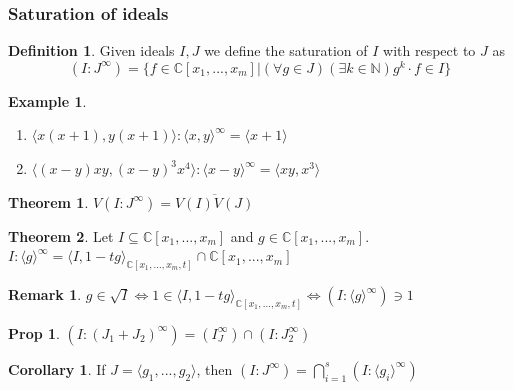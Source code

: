 \documentclass{article}
\theoremstyle{definition}
\newtheorem*{obs}{Remark}
\newtheorem{thm}{Theorem}
\newtheorem{cor}{Corollary}
\newtheorem*{prop}{Prop}
\newtheorem*{defn}{Definition}
\newtheorem{ex}{Example}
\newcommand{\N}{\mathbb{N}}
\newcommand{\C}{\mathbb{C}}
\begin{document}
\subsubsection{Saturation of ideals}
\begin{defn}
	Given ideals $I,J$ we define the saturation of $I$ with respect to $J$ as 
	$$
	(I:J^\infty)=\{f\in\C[x_1,...,x_m]|(\forall g\in J)(\exists k\in\N) g^k·f\in I\}
	$$
\end{defn}
\begin{ex}
	\begin{enumerate}
		\item $\langle x(x+1),y(x+1)\rangle:\langle x,y\rangle^\infty=\langle x+1\rangle$
		\item $\langle (x-y)xy,(x-y)^3x^4\rangle:\langle x-y\rangle^\infty=\langle xy,x^3\rangle$
	\end{enumerate}
\end{ex}
\begin{thm}
	$V(I:J^\infty)=\overline{V(I)V(J)}$
\end{thm}
\begin{thm}
	Let $I\subseteq\C[x_1,...,x_m]$ and $g\in\C[x_1,...,x_m]$. $I:\langle g\rangle^\infty=\langle I,1-tg\rangle_{\C[x_1,...,x_m,t]} \cap\C[x_1,...,x_m]$
\end{thm}
\begin{obs}
	$g\in\sqrt{I}\iff1\in\langle I,1-tg\rangle_{\C[x_1,...,x_m,t]}\iff(I:\langle g\rangle^\infty)\ni1$
\end{obs}
\begin{prop}
	$(I:(J_1+J_2)^\infty)=(I_J^\infty)\cap(I:J_2^\infty)$
\end{prop}
\begin{cor}
	If $J=\langle g_1,...,g_2\rangle$, then $(I:J^\infty)=\bigcap_{i=1}^s(I:\langle g_i\rangle^\infty)$
\end{cor}
\end{document}
